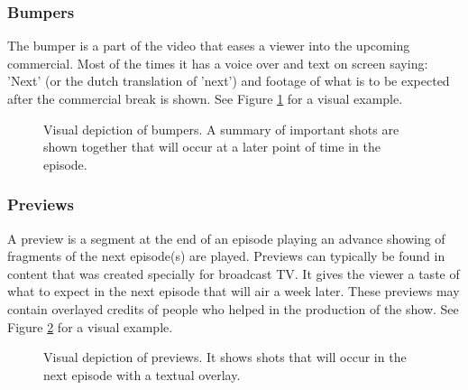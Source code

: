 \documentclass{report}
\begin{document}
\subsubsection{Bumpers}
The bumper is a part of the video that eases a viewer into the upcoming commercial. Most of the times it has a voice over and text on screen saying: 'Next' (or the dutch translation of 'next') and footage of what is to be expected after the commercial break is shown. See Figure \ref{fig:contextbumpers} for a visual example.

\begin{figure}[H]
	\caption{Visual depiction of bumpers. A summary of important shots are shown together that will occur at a later point of time in the episode.}
	\label{fig:contextbumpers}
\end{figure}

\subsubsection{Previews}
A preview is a segment at the end of an episode playing an advance showing of fragments of the next episode(s) are played. Previews can typically be found in content that was created specially for broadcast TV. It gives the viewer a taste of what to expect in the next episode that will air a week later. These previews may contain overlayed credits of people who helped in the production of the show. See Figure \ref{fig:contextpreviews} for a visual example.

\begin{figure}[H]
	\caption{Visual depiction of previews. It shows shots that will occur in the next episode with a textual overlay.}
	\label{fig:contextpreviews}
\end{figure}
\end{document}
